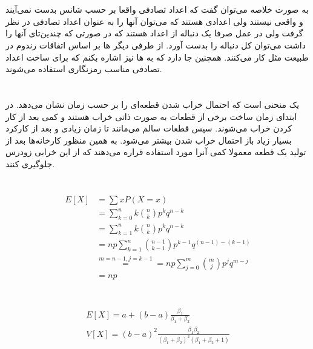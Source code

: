\documentclass[]{article}
\begin{document}
\printheader

\section{}
به صورت خلاصه می‌توان گفت که اعداد تصادفی
واقعا بر حسب شانس بدست نمی‌آیند و واقعی نیستند ولی اعدادی هستند که می‌توان آنها را به عنوان اعداد
تصادفی در نظر گرفت ولی در عمل صرفا یک دنباله از اعداد هستند که در صورتی که چندین‌تای آنها را داشت
می‌توان کل دنباله را بدست آورد. از طرفی دیگر
ها
بر اساس اتفاقات رندوم در طبیعت مثل
کار می‌کنند. همچنین جا دارد که به
ها
نیز اشاره بکنم که برای ساخت اعداد تصادفی مناسب رمزنگاری استفاده می‌شوند.

\section{}
یک منحنی است که احتمال خراب شدن قطعه‌ای را بر حسب زمان نشان می‌دهد. در ابتدای زمان ساخت برخی از
قطعات به صورت ذاتی خراب هستند و کمی بعد از کار کردن خراب می‌شوند. سپس قطعات سالم می‌مانند تا زمان زیادی و بعد از کارکرد
بسیار زیاد باز احتمال خراب شدن بیشتر می‌شود.
به همین منظور کارخانه‌ها بعد از تولید یک قطعه معمولا کمی آنرا مورد استفاده قراره می‌دهند که از این خرابی زودرس جلوگیری کنند.

\section{}
\begin{align*}
    E[X] &= \sum x P(X = x)\\
    &= \sum_{k \mathop = 0}^n k {n \choose k} p^k q^{n - k}\\
    &= \sum_{k \mathop = 1}^n k {n \choose k} p^k q^{n - k}\\
    &= n p \sum_{k \mathop = 1}^n {{n - 1} \choose {k - 1}} p^{k - 1} q^{(n - 1) - (k - 1)}\\
    &\stackrel{m=n-1, j=k-1}{=} = n p \sum_{j \mathop = 0}^m {m \choose j} p^j q^{m - j}\\
    &= np
\end{align*}

\section{}
\begin{gather*}
    E[X] = a + (b - a) \frac{\beta_1}{\beta_1 + \beta_2}\\
    V[X] = (b - a)^2 \frac{\beta_1 \beta_2}{(\beta_1+\beta_2)^2 (\beta_1 + \beta_2 + 1)}
\end{gather*}
\end{document}
